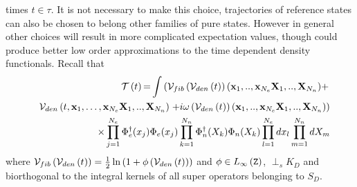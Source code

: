 times $t\in \tau $. It is not necessary to make this choice, trajectories of
reference states can also be chosen to belong other families of pure states.
However in general other choices will result in more complicated expectation
values, though could produce better low order approximations to the time
dependent density functionals. Recall that 
\begin{eqnarray}
&&{\cal T}\left( t\right) {\cal =}\int \left( {\cal V}_{fib}\left( {\cal V}%
_{den}\left( t\right) \right) ({\bf x}_{1},..,{\bf x}_{N_{e}}{\bf X}_{1},..,%
{\bf X}_{N_{n}})+\right.  \nonumber \\
&&{\cal V}_{den}\left( t,{\bf x}_{1},\ldots ,{\bf x}_{N_{e}}{\bf X}_{1},..,%
{\bf X}_{N_{n}}\right) \left. +i{\cal \omega }\left( {\cal V}_{den}\left(
t\right) \right) ({\bf x}_{1},..,{\bf x}_{N_{e}}{\bf X}_{1},..,{\bf X}%
_{N_{n}})\right)  \nonumber \\
&&\qquad \qquad \qquad \times \prod\limits_{j=1}^{N_{e}}\Phi _{e}^{\dagger
}(x_{j})\Phi _{e}(x_{j})\prod\limits_{k=1}^{N_{n}}\Phi _{n}^{\dagger
}(X_{k})\Phi
_{n}(X_{k})\prod\limits_{l=1}^{N_{e}}dx_{l}\prod_{m=1}^{N_{n}}dX_{m}
\end{eqnarray}%
where ${\cal V}_{fib}\left( {\cal V}_{den}\left( t\right) \right) =\frac{1}{2%
}\ln \left( 1+\phi \left( {\cal V}_{den}\left( t\right) \right) \right) $
and $\phi \in L_{\infty }\left( {\tt Z}\right) $, $\perp _{s}K_{D}$ and
biorthogonal to the integral kernels of all super operators belonging to $%
S_{D}$.

